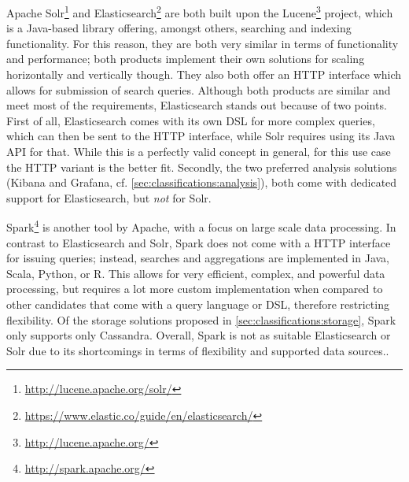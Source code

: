 \begin{table}[t]
\centering
\caption{Classification of data aggregation solutions. Support for arbitrary data structures and combination of aggregations is not considered here since all solutions fulfill this requirement.}
\label{table:classifications:aggregation}
\end{table}


Apache Solr\footnote{\url{http://lucene.apache.org/solr/}} and Elasticsearch\footnote{\url{https://www.elastic.co/guide/en/elasticsearch/}} are both built upon the Lucene\footnote{\url{http://lucene.apache.org/}} project, which is a Java-based library offering, amongst others, searching and indexing functionality.
For this reason, they are both very similar in terms of functionality and performance; both products implement their own solutions for scaling horizontally and vertically though.
They also both offer an HTTP interface which allows for submission of search queries.
Although both products are similar and meet most of the requirements, Elasticsearch stands out because of two points. 
First of all, Elasticsearch comes with its own \ac{DSL} for more complex queries, which can then be sent to the HTTP interface, while Solr requires using its Java API for that.
While this is a perfectly valid concept in general, for this use case the HTTP variant is the better fit.
Secondly, the two preferred analysis solutions (Kibana and Grafana, cf. \cref{sec:classifications:analysis}), both come with dedicated support for Elasticsearch, but \emph{not} for Solr.


Spark\footnote{\url{http://spark.apache.org/}} is another tool by Apache, with a focus on large scale data processing.
In contrast to Elasticsearch and Solr, Spark does not come with a HTTP interface for issuing queries; instead, searches and aggregations are implemented in Java, Scala, Python, or R.
This allows for very efficient, complex, and powerful data processing, but requires a lot more custom implementation when compared to other candidates that come with a query language or \ac{DSL}, therefore restricting flexibility.
Of the storage solutions proposed in \cref{sec:classifications:storage}, Spark only supports only Cassandra.
Overall, Spark is not as suitable Elasticsearch or Solr due to its shortcomings in terms of flexibility and supported data sources..


